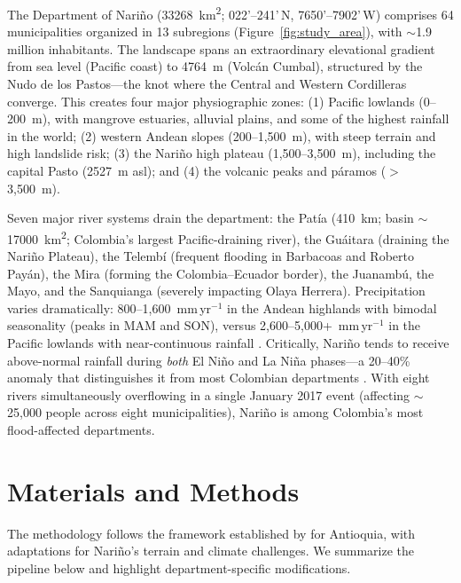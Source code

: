 \documentclass{article}
\begin{document}
The Department of Nari\~no (\SI{33268}{\kilo\metre\squared}; 0\textdegree{}22'--2\textdegree{}41'\,N, 76\textdegree{}50'--79\textdegree{}02'\,W) comprises 64 municipalities organized in 13 subregions (Figure~\ref{fig:study_area}), with $\sim$1.9 million inhabitants. The landscape spans an extraordinary elevational gradient from sea level (Pacific coast) to \SI{4764}{\metre} (Volc\'an Cumbal), structured by the Nudo de los Pastos---the knot where the Central and Western Cordilleras converge. This creates four major physiographic zones: (1) Pacific lowlands (0--200~m), with mangrove estuaries, alluvial plains, and some of the highest rainfall in the world; (2) western Andean slopes (200--1,500~m), with steep terrain and high landslide risk; (3) the Nari\~no high plateau (1,500--3,500~m), including the capital Pasto (\SI{2527}{\metre} asl); and (4) the volcanic peaks and p\'aramos ($>$3,500~m).

Seven major river systems drain the department: the Pat\'ia (410~km; basin $\sim$\SI{17000}{\kilo\metre\squared}; Colombia's largest Pacific-draining river), the Gu\'aitara (draining the Nari\~no Plateau), the Telemb\'i (frequent flooding in Barbacoas and Roberto Pay\'an), the Mira (forming the Colombia--Ecuador border), the Juanamb\'u, the Mayo, and the Sanquianga (severely impacting Olaya Herrera). Precipitation varies dramatically: 800--1,600~mm\,yr$^{-1}$ in the Andean highlands with bimodal seasonality (peaks in MAM and SON), versus 2,600--5,000+~mm\,yr$^{-1}$ in the Pacific lowlands with near-continuous rainfall \citep{Mesa2006, Urrea2019, CarvajalEscobar2022}. Critically, Nari\~no tends to receive above-normal rainfall during \textit{both} El Ni\~no and La Ni\~na phases---a 20--40\% anomaly that distinguishes it from most Colombian departments \citep{Enciso2020, Poveda2001}. With eight rivers simultaneously overflowing in a single January 2017 event (affecting $\sim$25,000 people across eight municipalities), Nari\~no is among Colombia's most flood-affected departments.

\section{Materials and Methods}
\label{sec:methods}

The methodology follows the framework established by \citet{EspinalMaya2026Antioquia} for Antioquia, with adaptations for Nari\~no's terrain and climate challenges. We summarize the pipeline below and highlight department-specific modifications.
\end{document}
